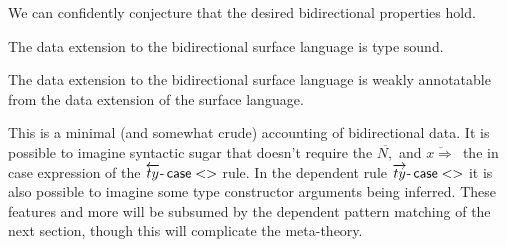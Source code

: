 We can confidently conjecture that the desired bidirectional properties hold.
\begin{conjecture}
The data extension to the bidirectional surface language is type sound.
\end{conjecture}

\begin{conjecture}
The data extension to the bidirectional surface language is weakly annotatable from the data extension of the surface language.
\end{conjecture}

This is a minimal (and somewhat crude) accounting of bidirectional data.
It is possible to imagine syntactic sugar that doesn't require the $\overline{N,}$ and $\overline{x\Rightarrow}\,$ the in case expression of the $\operatorname{\overleftarrow{ty}-}\mathsf{case}<>$ rule.
In the dependent rule $\operatorname{\overrightarrow{ty}-}\mathsf{case}<>$ it is also possible to imagine some type constructor arguments being inferred.
These features and more will be subsumed by the dependent pattern matching of the next section, though this will complicate the meta-theory.
